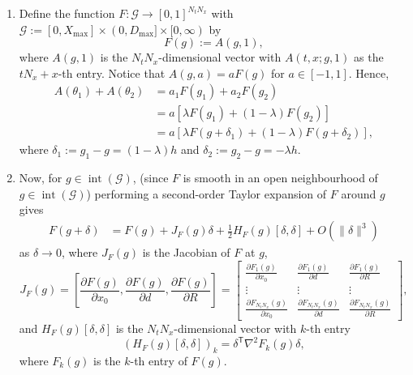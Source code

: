 \documentclass{homework}
\newcommand{\norm}[1]{\|  #1 \|}
\begin{document}
\begin{enumerate}
    \item Define the function $F: \mathcal{G} \to [0,1]^{N_t N_x}$
    with $\mathcal{G}:= [0,X_{\text{max}}]\times (0,D_{\text{max}}] \times[0, \infty)$
    by 
    \[F(g) := A(g, 1),\] 
    where $A(g,1)$ is the $N_t N_x$-dimensional vector with $A(t,x;g,1)$ as the $t N_x + x$-th entry.
    Notice that $A(g, a) = aF(g)$ for $a \in [-1, 1]$. Hence, 
    \begin{align}
    A(\theta_1) + A(\theta_2) 
    &= a_1F(g_1) + a_2F(g_2) \nonumber\\
    &= a\left[\lambda F(g_1) + (1-\lambda )F(g_2)\right] \nonumber\\
    &= a\left[\lambda F(g + \delta_1) + (1-\lambda )F(g + \delta_2)\right], \label{eq:sum_forward_map}
    \end{align}
    where $\delta_1 := g_1 - g = (1-\lambda)h$ and $\delta_2 := g_2 - g = -\lambda h$.

    \item Now, for $g \in \operatorname{int}\left({\mathcal{G}}\right)$, 
    (since $F$ is smooth in an open neighbourhood of $g\in\operatorname{int}\left({\mathcal{G}}\right)$) 
    performing a second-order Taylor expansion of $F$ around $g$ gives
    \begin{align}
    F(g + \delta)
    &= F(g) + J_F(g) \delta + \frac{1}{2} H_F(g)[\delta, \delta] + O(\norm{\delta}^3) \label{eq:taylor_expansion}
    \end{align}
    as $\delta \to 0$, where $J_F(g)$ is the Jacobian of $F$ at $g$,
    \[
    J_F(g) = \left[
    \frac{\partial F(g)}{\partial x_0},
    \frac{\partial F(g)}{\partial d},
    \frac{\partial F(g)}{\partial R}
    \right]
    =
    \begin{bmatrix}
    \frac{\partial F_1(g)}{\partial x_0}
    &
    \frac{\partial F_1(g)}{\partial d}
    &
    \frac{\partial F_1(g)}{\partial R}
    \\
    \vdots & \vdots & \vdots
    \\
    \frac{\partial F_{N_tN_x}(g)}{\partial x_0}
    &
    \frac{\partial F_{N_tN_x}(g)}{\partial d}
    &
    \frac{\partial F_{N_tN_x}(g)}{\partial R}
    \end{bmatrix},
    \]
    and $H_F(g)[\delta, \delta]$ is the $N_t N_x$-dimensional vector with $k$-th entry
    \[
    \left(H_F(g)[\delta, \delta]\right)_k = \delta^\mathsf T \nabla^2 F_k(g) \delta,
    \]
    where $F_k(g)$ is the $k$-th entry of $F(g)$.


\end{enumerate}
\end{document}
